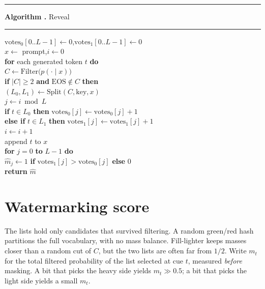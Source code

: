 \documentclass[11pt]{article}
\newcounter{algo}
\newcommand{\alghead}[2]{%
  \par\vspace{0.55em}\noindent
  \begin{minipage}{\columnwidth}
  \hrule\vspace{0.4em}
  \refstepcounter{algo}\label{#1}%
  {\small\textbf{Algorithm \thealgo.} #2}\par
  \vspace{0.15em}\hrule\vspace{0.35em}
  \small
}
\begin{document}
\alghead{alg:reveal}{Reveal}
\noindent
$\mathrm{votes}_0[0..L{-}1] \leftarrow 0$,\quad $\mathrm{votes}_1[0..L{-}1] \leftarrow 0$\\
$x \leftarrow$ prompt,\quad $i \leftarrow 0$\\
\textbf{for} each generated token $t$ \textbf{do}\\
\hspace*{1em}$C \leftarrow \mathrm{Filter}\bigl(p(\cdot \mid x)\bigr)$\\
\hspace*{1em}\textbf{if} $|C| \ge 2$ \textbf{and} $\mathrm{EOS}\notin C$ \textbf{then}\\
\hspace*{2em}$(L_0, L_1) \leftarrow \mathrm{Split}(C, \mathrm{key}, x)$\\
\hspace*{2em}$j \leftarrow i \bmod L$\\
\hspace*{2em}\textbf{if} $t \in L_0$ \textbf{then} $\mathrm{votes}_0[j] \leftarrow \mathrm{votes}_0[j] + 1$\\
\hspace*{2em}\textbf{else if} $t \in L_1$ \textbf{then} $\mathrm{votes}_1[j] \leftarrow \mathrm{votes}_1[j] + 1$\\
\hspace*{2em}$i \leftarrow i + 1$\\
\hspace*{1em}append $t$ to $x$\\
\textbf{for} $j = 0$ \textbf{to} $L-1$ \textbf{do}\\
\hspace*{1em}$\hat{m}_j \leftarrow 1$ \textbf{if} $\mathrm{votes}_1[j] > \mathrm{votes}_0[j]$ \textbf{else} $0$\\
\textbf{return} $\hat{m}$
\end{minipage}

\section{Watermarking score}
\label{sec:wscore}

The lists hold only candidates that survived filtering.
A random green/red hash partitions the full vocabulary, with no mass balance.
Fill-lighter keeps masses closer than a random cut of $C$, but the two lists are often far from $1/2$.
Write $m_t$ for the total filtered probability of the list selected at cue $t$, measured \emph{before} masking.
A bit that picks the heavy side yields $m_t \gg 0.5$; a bit that picks the light side yields a small $m_t$.
\end{document}
